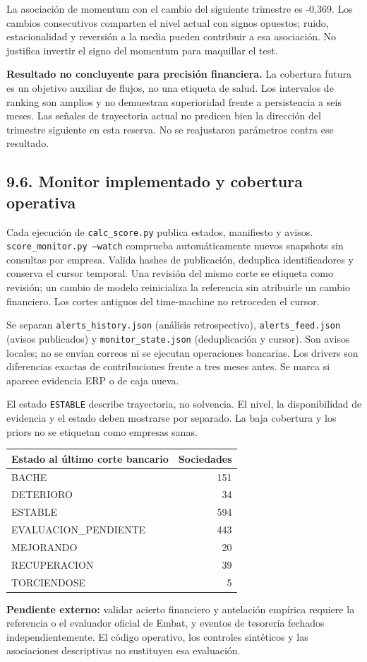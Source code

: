 La asociación de momentum con el cambio del siguiente trimestre es -0,369. Los cambios consecutivos comparten el nivel actual con signos opuestos; ruido, estacionalidad y reversión a la media pueden contribuir a esa asociación. No justifica invertir el signo del momentum para maquillar el test.

\textbf{Resultado no concluyente para precisión financiera.} La cobertura futura es un objetivo auxiliar de flujos, no una etiqueta de salud. Los intervalos de ranking son amplios y no demuestran superioridad frente a persistencia a seis meses. Las señales de trayectoria actual no predicen bien la dirección del trimestre siguiente en esta reserva. No se reajustaron parámetros contra ese resultado.

\subsection*{9.6. Monitor implementado y cobertura operativa}
Cada ejecución de \texttt{calc\_score.py} publica estados, manifiesto y avisos. \texttt{score\_monitor.py --watch} comprueba automáticamente nuevos snapshots sin consultas por empresa. Valida hashes de publicación, deduplica identificadores y conserva el cursor temporal. Una revisión del mismo corte se etiqueta como revisión; un cambio de modelo reinicializa la referencia sin atribuirle un cambio financiero. Los cortes antiguos del time-machine no retroceden el cursor.

Se separan \texttt{alerts\_history.json} (análisis retrospectivo), \texttt{alerts\_feed.json} (avisos publicados) y \texttt{monitor\_state.json} (deduplicación y cursor). Son avisos locales; no se envían correos ni se ejecutan operaciones bancarias. Los drivers son diferencias exactas de contribuciones frente a tres meses antes. Se marca si aparece evidencia ERP o de caja nueva.

El estado \texttt{ESTABLE} describe trayectoria, no solvencia. El nivel, la disponibilidad de evidencia y el estado deben mostrarse por separado. La baja cobertura y los priors no se etiquetan como empresas sanas.

\begin{center}
\small
\begin{tabular}{lr}
\hline
Estado al último corte bancario & Sociedades \\
\hline
BACHE & 151 \\
DETERIORO & 34 \\
ESTABLE & 594 \\
EVALUACION\_PENDIENTE & 443 \\
MEJORANDO & 20 \\
RECUPERACION & 39 \\
TORCIENDOSE & 5 \\
\hline
\end{tabular}
\end{center}

\textbf{Pendiente externo:} validar acierto financiero y antelación empírica requiere la referencia o el evaluador oficial de Embat, y eventos de tesorería fechados independientemente. El código operativo, los controles sintéticos y las asociaciones descriptivas no sustituyen esa evaluación.
